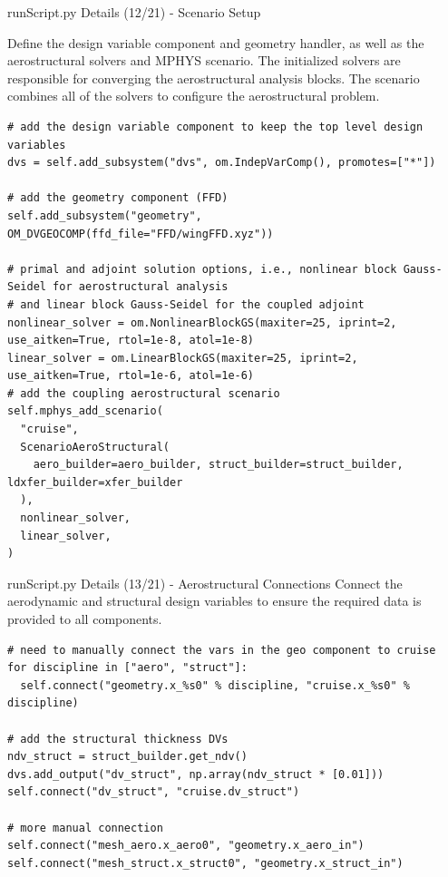 \documentclass{bredelebeamer}
\begin{document}
\begin{frame}[fragile]{runScript.py Details (12/21) - \large Scenario Setup}

Define the design variable component and geometry handler, as well as the aerostructural solvers and MPHYS scenario. The initialized solvers are responsible for converging the aerostructural analysis blocks. The scenario combines all of the solvers to configure the aerostructural problem.
\scriptsize
\lstset{ language=bash }
\begin{lstlisting}
# add the design variable component to keep the top level design variables
dvs = self.add_subsystem("dvs", om.IndepVarComp(), promotes=["*"])

# add the geometry component (FFD)
self.add_subsystem("geometry", OM_DVGEOCOMP(ffd_file="FFD/wingFFD.xyz"))

# primal and adjoint solution options, i.e., nonlinear block Gauss-Seidel for aerostructural analysis
# and linear block Gauss-Seidel for the coupled adjoint
nonlinear_solver = om.NonlinearBlockGS(maxiter=25, iprint=2, use_aitken=True, rtol=1e-8, atol=1e-8)
linear_solver = om.LinearBlockGS(maxiter=25, iprint=2, use_aitken=True, rtol=1e-6, atol=1e-6)
# add the coupling aerostructural scenario
self.mphys_add_scenario(
  "cruise",
  ScenarioAeroStructural(
    aero_builder=aero_builder, struct_builder=struct_builder, ldxfer_builder=xfer_builder
  ),
  nonlinear_solver,
  linear_solver,
)
\end{lstlisting}
\normalsize
\end{frame}

\begin{frame}[fragile]{runScript.py Details (13/21) - \large Aerostructural Connections}
Connect the aerodynamic and structural design variables to ensure the required data is provided to all components.
\scriptsize
\lstset{ language=bash }
\begin{lstlisting}
# need to manually connect the vars in the geo component to cruise
for discipline in ["aero", "struct"]:
  self.connect("geometry.x_%s0" % discipline, "cruise.x_%s0" % discipline)

# add the structural thickness DVs
ndv_struct = struct_builder.get_ndv()
dvs.add_output("dv_struct", np.array(ndv_struct * [0.01]))
self.connect("dv_struct", "cruise.dv_struct")

# more manual connection
self.connect("mesh_aero.x_aero0", "geometry.x_aero_in")
self.connect("mesh_struct.x_struct0", "geometry.x_struct_in")
\end{lstlisting}
\normalsize
\end{frame}
\end{document}
